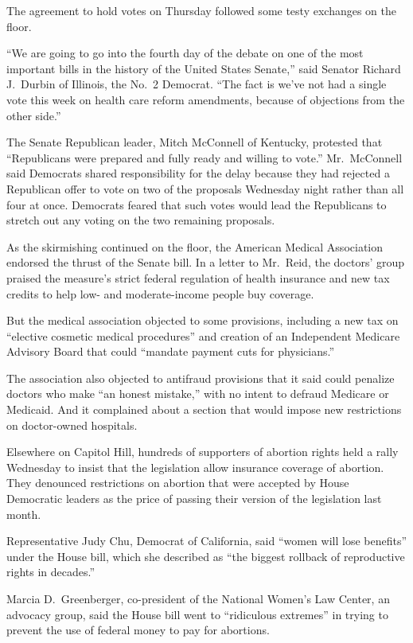 ﻿\documentclass[12pt]{article}
\begin{document}
The agreement to hold votes on Thursday followed some testy exchanges on the floor.

``We are going to go into the fourth day of the debate on one of the most important bills in the
history of the United States Senate,'' said Senator Richard J.~Durbin of Illinois, the No.~2
Democrat. ``The fact is we've not had a single vote this week on health care reform amendments,
because of objections from the other side.''

The Senate Republican leader, Mitch McConnell of Kentucky, protested that ``Republicans were
prepared and fully ready and willing to vote.'' Mr.~McConnell said Democrats shared responsibility
for the delay because they had rejected a Republican offer to vote on two of the proposals Wednesday
night rather than all four at once. Democrats feared that such votes would lead the Republicans to
stretch out any voting on the two remaining proposals.

As the skirmishing continued on the floor, the American Medical Association endorsed the thrust of
the Senate bill. In a letter to Mr.~Reid, the doctors' group praised the measure's strict federal
regulation of health insurance and new tax credits to help low- and moderate-income people buy
coverage.

But the medical association objected to some provisions, including a new tax on ``elective cosmetic
medical procedures'' and creation of an Independent Medicare Advisory Board that could ``mandate
payment cuts for physicians.''

The association also objected to antifraud provisions that it said could penalize doctors who make
``an honest mistake,'' with no intent to defraud Medicare or Medicaid. And it complained about a
section that would impose new restrictions on doctor-owned hospitals.

Elsewhere on Capitol Hill, hundreds of supporters of abortion rights held a rally Wednesday to
insist that the legislation allow insurance coverage of abortion. They denounced restrictions on
abortion that were accepted by House Democratic leaders as the price of passing their version of the
legislation last month.

Representative Judy Chu, Democrat of California, said ``women will lose benefits'' under the House
bill, which she described as ``the biggest rollback of reproductive rights in decades.''

Marcia D.~Greenberger, co-president of the National Women's Law Center, an advocacy group, said the
House bill went to ``ridiculous extremes'' in trying to prevent the use of federal money to pay for
abortions.
\end{document}
